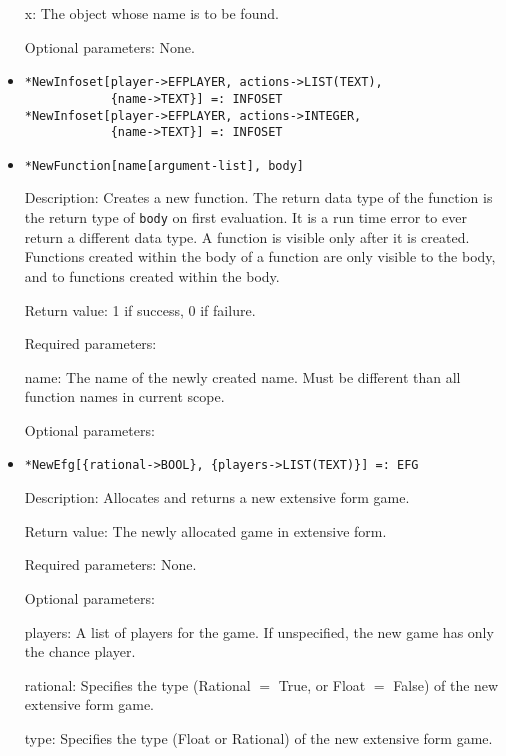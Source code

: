 \begin{itemize}
\bd
\item
[x:] The object whose name is to be found.
\ed

\item
[Optional parameters:] None.
\ed


\item
\protect \large \begin{verbatim} 
*NewInfoset[player->EFPLAYER, actions->LIST(TEXT),
            {name->TEXT}] =: INFOSET
*NewInfoset[player->EFPLAYER, actions->INTEGER,
            {name->TEXT}] =: INFOSET
\end{verbatim}\normalsize


\item   
\protect \large \begin{verbatim}
*NewFunction[name[argument-list], body]
\end{verbatim}\normalsize

\bd
\item
[Description:] Creates a new function.  The return data type of the
function is the return type of \verb+body+ on first evaluation.  It is
a run time error to ever return a different data type.  A function is
visible only after it is created.  Functions created within the body
of a function are only visible to the body, and to functions created
within the body.
\item
[Return value:] 1 if success, 0 if failure.  
\item
[Required parameters:]
\bd
\item[name:] The name of the newly created name.  Must be different
than all function names in current scope.  
\ed
\item
[Optional parameters:]\hfil\null
\ed

\item
\protect \large \begin{verbatim} 
*NewEfg[{rational->BOOL}, {players->LIST(TEXT)}] =: EFG
\end{verbatim}\normalsize

\bd
\item
[Description:] Allocates and returns a new extensive form game.
\item
[Return value:] The newly allocated game in extensive form.
\item
[Required parameters:] None.\hfil\null
\item
[Optional parameters:]\hfil\null

\bd
\item
[players:] A list of players for the game.  If
unspecified, the new game has only the chance player.
\item
[rational:] Specifies the type (Rational $=$ True, or Float $=$ False)
of the new extensive form game.
\item
[type:] Specifies the type (Float or Rational) of the new extensive
form game.
\ed
\ed


\end{itemize}
